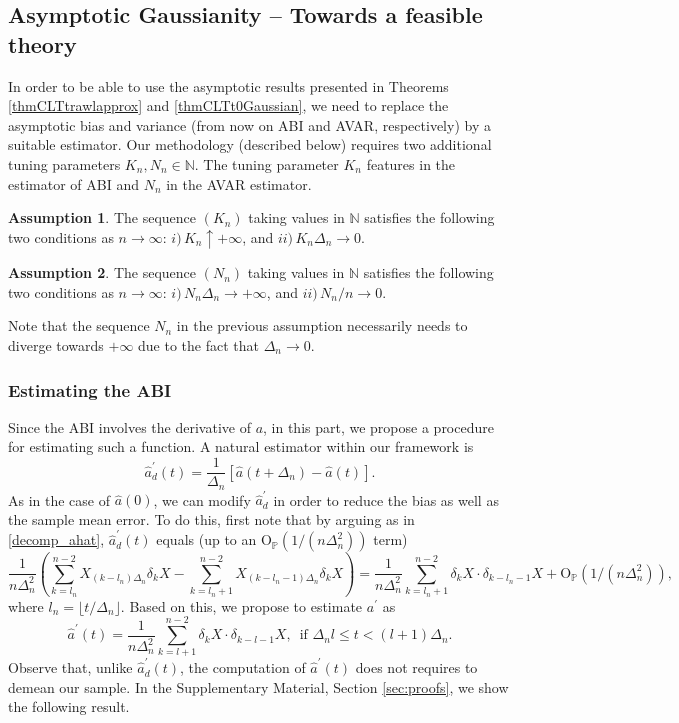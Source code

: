 \documentclass{article}
\theoremstyle{plain}
\theoremstyle{definition}
\newtheorem{assumption}{Assumption}
\theoremstyle{remark}
\begin{document}
\subsection{Asymptotic Gaussianity -- Towards a feasible theory}


In order to be able to use the asymptotic results presented in Theorems
\ref{thmCLTtrawlapprox} and \ref{thmCLTt0Gaussian}, we need to replace
the asymptotic bias and variance (from
now on ABI and AVAR, respectively) by a suitable estimator. Our methodology (described
below) requires two additional tuning parameters  $K_{n}, N_{n}\in\mathbb{N}$. The tuning parameter $K_n$ features in the estimator of  ABI and  $N_n$ in the AVAR estimator.

\begin{assumption}\label{as:Knprop}
	The sequence $(K_n)$ taking values in $\mathbb{N}$ satisfies the following two conditions as $n\rightarrow\infty$:
	$i) \, K_{n}\uparrow+\infty$, and  $ii) \,K_{n}\Delta_{n}\rightarrow0$.%
\end{assumption}


\begin{assumption}\label{as:Nnprop}
	The sequence $(N_n)$ taking values in $\mathbb{N}$ satisfies the following two conditions as $n\rightarrow\infty$:
	$i) \, N_{n}\Delta_{n}\rightarrow+\infty$, and $ii) \, N_{n}/n\rightarrow0$. 
\end{assumption} 
Note that the sequence $N_n$ in the previous assumption necessarily needs to diverge towards $+\infty$ due to the fact that $\Delta_n\rightarrow0$.




\subsubsection{Estimating the ABI}
Since the ABI involves the derivative of $a$, in this part, we propose
a procedure for estimating such a function. A natural estimator
within our framework is
\[\hat{a}^{\prime}_d(t)=\frac{1}{\Delta_{n}}[\hat{a}(t+\Delta_{n})-\hat{a}(t)].\]
As in the case of $\hat{a}(0)$, we can modify $\hat{a}^{\prime}_d$ in order to reduce the bias as well as the sample mean error. To do this, first note that by arguing as in \eqref{decomp_ahat}, $\hat{a}^{\prime}_d(t)$ equals (up to an $\mathrm{O}_{\mathbb{P}}(1/(n\Delta_{n}^2))$ term)
\[\frac{1}{n\Delta_{n}^2}\left(\sum_{k=l_{n}}^{n-2}X_{(k-l_{n})\Delta_{n}}\delta_{k}X-\sum_{k=l_{n}+1}^{n-2}X_{(k-l_{n}-1)\Delta_{n}}\delta_{k}X\right)
 =\frac{1}{n\Delta_{n}^{2}}\sum_{k=l_n+1}^{n-2}\delta_{k}X\cdot\delta_{k-l_n-1}X +\mathrm{O}_{\mathbb{P}}(1/(n\Delta_{n}^2)),\]
where $l_n=\lfloor t/\Delta_n\rfloor$. Based on this, we propose to estimate $a^{\prime}$ as
\begin{equation}
	\hat{a}^{\prime}(t)=\frac{1}{n\Delta_{n}^{2}}\sum_{k=l+1}^{n-2}\delta_{k}X\cdot\delta_{k-l-1}X,\,\,\,\text{if }\Delta_{n}l\leq t<(l+1)\Delta_{n}.\label{eq:aderdef}
\end{equation}
Observe that, unlike $\hat{a}^{\prime}_d(t)$, the computation of $\hat{a}^{\prime}(t)$ does not requires to demean our sample. In the Supplementary Material, Section \ref{sec:proofs},  
we show the following result.
\end{document}
